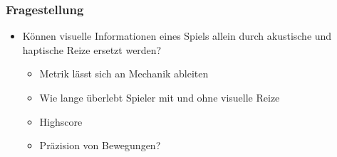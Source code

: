\documentclass{beamer}
\begin{document}
\begin{frame}
\frametitle{Fragestellung}
\begin{itemize}
	\item Können visuelle Informationen eines Spiels allein durch akustische und
	haptische Reize ersetzt werden?
	\begin{itemize}
		\item Metrik lässt sich an Mechanik ableiten
		\item Wie lange überlebt Spieler mit und ohne visuelle Reize
		\item Highscore
		\item Präzision von Bewegungen?
	\end{itemize}
\end{itemize}
\end{frame}
\end{document}
